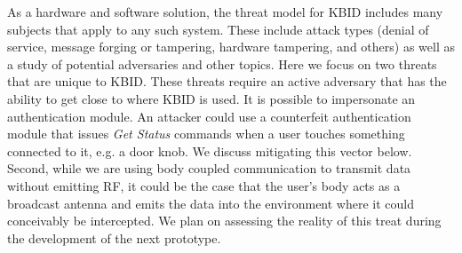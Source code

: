 As a hardware and software solution, the threat model for KBID includes many subjects that apply to any such system.  These include attack types (denial of service, message forging or tampering, hardware tampering, and others) as well as a study of potential adversaries and other topics.  Here we focus on two threats that are unique to KBID.  These threats require an active adversary that has the ability to get close to where KBID is used.  It is possible to impersonate an authentication module.  An attacker could use a counterfeit authentication module that issues \emph{Get Status} commands when a user touches something connected to it, e.g. a door knob.  We discuss mitigating this vector below. Second, while we are using body coupled communication to transmit data without emitting RF, it could be the case that the user's body acts as a broadcast antenna and emits the data into the environment where it could conceivably be intercepted.  We plan on assessing the reality of this treat during the development of the next prototype.
